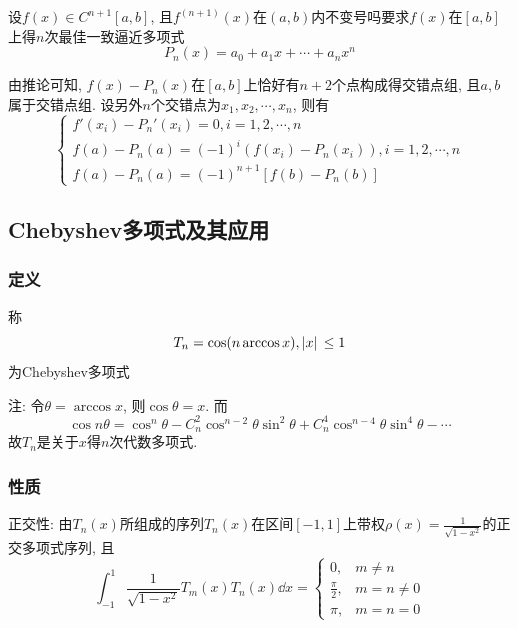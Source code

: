 设$f(x)\in C^{n+1}[a,b]$, 且$f^{(n+1)}(x)$在$(a,b)$内不变号吗要求$f(x)$在$[a,b]$上得$n$次最佳一致逼近多项式
\begin{equation*}
    P_n(x)=a_0+a_1x+\cdots+a_nx^n
\end{equation*}

由推论可知, $f(x)-P_n(x)$在$[a,b]$上恰好有$n+2$个点构成得交错点组, 且$a,b$属于交错点组. 设另外$n$个交错点为$x_1,x_2,\cdots,x_n$, 则有
\begin{equation*}
    \begin{cases}
        f'(x_i)-P_n'(x_i)=0, i=1,2,\cdots,n\\
        f(a)-P_n(a)=(-1)^i(f(x_i)-P_n(x_i)), i=1,2,\cdots,n\\
        f(a)-P_n(a)=(-1)^{n+1}\left[f(b)-P_n(b)\right]
    \end{cases}
\end{equation*}

\subsection{Chebyshev多项式及其应用}

\subsubsection{定义}

\begin{definition}[Chebyshev多项式]
    称
    \begin{equation*}
        T_n=\cos(n\arccos{x}), \abs*{x}\le 1
    \end{equation*}
    为Chebyshev多项式
\end{definition}

注: 令$\theta=\arccos{x}$, 则$\cos\theta=x$. 而
\begin{equation*}
    \cos{n\theta}=\cos^n{\theta}-C_n^2\cos^{n-2}{\theta}\sin^2\theta+C_n^4\cos^{n-4}\theta\sin^4\theta-\cdots
\end{equation*}
故$T_n$是关于$x$得$n$次代数多项式.

\subsubsection{性质}

正交性: 由$T_n(x)$所组成的序列${T_n(x)}$在区间$[-1,1]$上带权$\rho(x)=\frac{1}{\sqrt{1-x^2}}$的正交多项式序列, 且
\begin{equation*}
    \int_{-1}^1\frac{1}{\sqrt{1-x^2}}T_m(x)T_n(x)\dd{x}=
    \begin{cases}
        0,&m\ne n\\
        \frac{\pi}{2},&m=n\ne0\\
        \pi,&m=n=0
    \end{cases}
\end{equation*}

